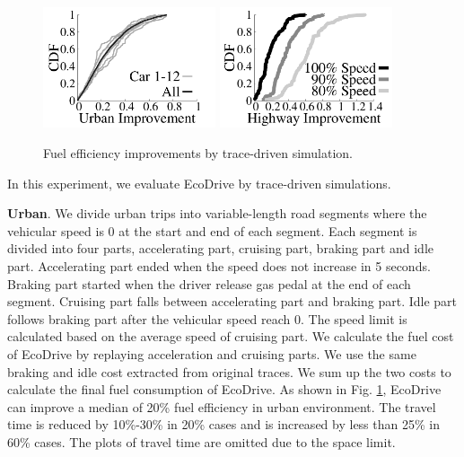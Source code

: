 \begin{figure}[!htbp]
\begin{center}
\includegraphics[width=2.0in,angle=0]{Figs/EcoDrive/evaluation/urban_cdf_all.pdf}
\hspace{-0.5cm}
\includegraphics[width=2.0in,angle=0]{Figs/EcoDrive/evaluation/hwy_improve_cdf.pdf}
\vspace{-0.2cm}
\caption{Fuel efficiency improvements by trace-driven simulation.}
\vspace{-0.6cm}
\label{tracedriven}
\end{center}
\end{figure}

In this experiment, we evaluate EcoDrive by trace-driven simulations. 

\textbf{Urban}. We divide urban trips into variable-length road segments 
where the vehicular speed is 0 at the start and end of each segment. 
Each segment is divided into four parts, accelerating part, cruising part, 
braking part and idle part. 
Accelerating part ended when the speed does not increase in 5 seconds. 
Braking part started when the driver release gas pedal at the end of each segment. 
Cruising part falls between accelerating part and braking part.
Idle part follows braking part after the vehicular speed reach 0.  
The speed limit is calculated based on the average speed of cruising part. 
We calculate the fuel cost of EcoDrive by replaying acceleration and cruising parts.
We use the same braking and idle cost extracted from original traces.
We sum up the two costs to calculate the final fuel consumption of EcoDrive. 
As shown in Fig. \ref{tracedriven}, EcoDrive can improve a median of 
20\% fuel efficiency in urban environment. 
The travel time is reduced by 10\%-30\% in 20\% cases and is increased
by less than 25\% in 60\% cases. 
The plots of travel time are omitted due to the space limit.   

